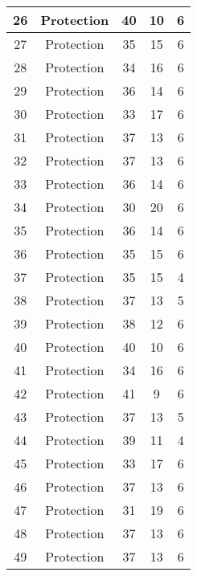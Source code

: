 \documentclass[results.tex]{subfiles}
\begin{document}
\begin{center}
\begin{tabular}{| c || c | c | c | c |}
    \hline
    26 & Protection & 40 & 10 & 6 \\ 
    \hline
    27 & Protection & 35 & 15 & 6 \\ 
    \hline
    28 & Protection & 34 & 16 & 6 \\ 
    \hline
    29 & Protection & 36 & 14 & 6 \\ 
    \hline
    30 & Protection & 33 & 17 & 6 \\ 
    \hline
    31 & Protection & 37 & 13 & 6 \\ 
    \hline
    32 & Protection & 37 & 13 & 6 \\ 
    \hline
    33 & Protection & 36 & 14 & 6 \\ 
    \hline
    34 & Protection & 30 & 20 & 6 \\ 
    \hline
    35 & Protection & 36 & 14 & 6 \\ 
    \hline
    36 & Protection & 35 & 15 & 6 \\ 
    \hline
    37 & Protection & 35 & 15 & 4 \\ 
    \hline
    38 & Protection & 37 & 13 & 5 \\ 
    \hline
    39 & Protection & 38 & 12 & 6 \\ 
    \hline
    40 & Protection & 40 & 10 & 6 \\ 
    \hline
    41 & Protection & 34 & 16 & 6 \\ 
    \hline
    42 & Protection & 41 & 9 & 6 \\ 
    \hline
    43 & Protection & 37 & 13 & 5 \\ 
    \hline
    44 & Protection & 39 & 11 & 4 \\ 
    \hline
    45 & Protection & 33 & 17 & 6 \\ 
    \hline
    46 & Protection & 37 & 13 & 6 \\ 
    \hline
    47 & Protection & 31 & 19 & 6 \\ 
    \hline
    48 & Protection & 37 & 13 & 6 \\ 
    \hline
    49 & Protection & 37 & 13 & 6 \\ 
    \hline   \end{tabular}
\end{center}
\end{document}
